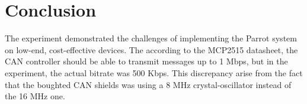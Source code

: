 \documentclass[10pt,twocolumn,letterpaper]{article}
\begin{document}
\section{Conclusion}

The experiment demonstrated the challenges of implementing the Parrot system on low-end, cost-effective devices.
The according to the MCP2515 datasheet, the CAN controller should be able to transmit messages up to 1 Mbps, but in the experiment, the actual bitrate was 
500 Kbps. This discrepancy arise from the fact that the boughted CAN shields was using a 8 MHz crystal-oscillator instead of the 16 MHz one.



{\small
    
    
}
\end{document}
